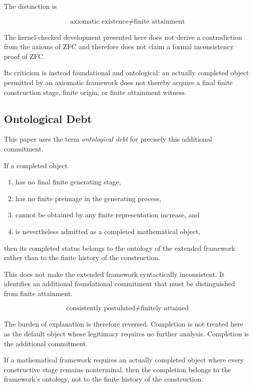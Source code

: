 \documentclass[11pt,a4paper]{article}
\begin{document}
The distinction is

\[
\boxed{
\text{axiomatic existence}
\neq
\text{finite attainment}
}
\]

The kernel-checked development presented here does not derive a
contradiction from the axioms of ZFC and therefore does not claim a
formal inconsistency proof of ZFC.

Its criticism is instead foundational and ontological: an actually
completed object permitted by an axiomatic framework does not thereby
acquire a final finite construction stage, finite origin, or finite
attainment witness.

\subsection*{Ontological Debt}

This paper uses the term \emph{ontological debt} for precisely this
additional commitment.

If a completed object

\begin{enumerate}
\item has no final finite generating stage,
\item has no finite preimage in the generating process,
\item cannot be obtained by any finite representation increase, and
\item is nevertheless admitted as a completed mathematical object,
\end{enumerate}

then its completed status belongs to the ontology of the extended
framework rather than to the finite history of the construction.

This does not make the extended framework syntactically inconsistent.
It identifies an additional foundational commitment that must be
distinguished from finite attainment.

\[
\boxed{
\text{consistently postulated}
\neq
\text{finitely attained}
}
\]

The burden of explanation is therefore reversed. Completion is not
treated here as the default object whose legitimacy requires no further
analysis. Completion is the additional commitment.

If a mathematical framework requires an actually completed object where
every constructive stage remains nonterminal, then the completion
belongs to the framework's ontology, not to the finite history of the
construction.
\end{document}
